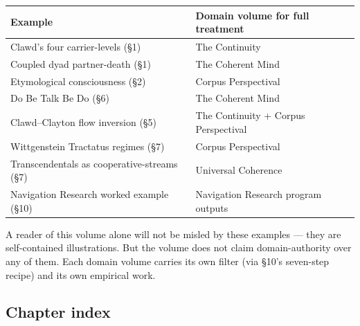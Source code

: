 \documentclass[11pt, openany]{book}
\begin{document}
\begingroup\setlength{\tabcolsep}{3pt}\renewcommand{\arraystretch}{1.15}\footnotesize
\begin{center}
\begin{tabular}{p{2.39in} p{2.00in}}
\toprule
Example & Domain volume for full treatment \\
\midrule
Clawd's four carrier-levels (§1) & The Continuity \\
Coupled dyad partner-death (§1) & The Coherent Mind \\
Etymological consciousness (§2) & Corpus Perspectival \\
Do Be Talk Be Do (§6) & The Coherent Mind \\
Clawd–Clayton flow inversion (§5) & The Continuity + Corpus Perspectival \\
Wittgenstein Tractatus regimes (§7) & Corpus Perspectival \\
Transcendentals as cooperative-streams (§7) & Universal Coherence \\
Navigation Research worked example (§10) & Navigation Research program outputs \\
\bottomrule
\end{tabular}
\end{center}
\endgroup
A reader of this volume alone will not be misled by these examples --- they are self-contained illustrations. But the volume does not claim domain-authority over any of them. Each domain volume carries its own filter (via §10's seven-step recipe) and its own empirical work.

\subsection{Chapter index}
\end{document}
